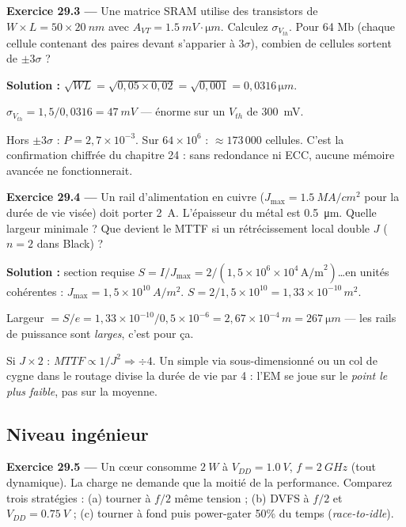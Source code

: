 \documentclass[12pt,a4paper,twoside]{book}
\begin{document}
\textbf{Exercice 29.3 ---} Une matrice SRAM utilise des transistors de $W{\times}L = 50{\times}\SI{20}{nm}$ avec $A_{VT} = \SI{1.5}{mV\cdot\micro m}$. Calculez $\sigma_{V_{th}}$. Pour 64 Mb (chaque cellule contenant des paires devant s'apparier à $3\sigma$), combien de cellules sortent de $\pm 3\sigma$ ?

\begin{pratique}
\textbf{Solution :} $\sqrt{WL} = \sqrt{0{,}05\times0{,}02} = \sqrt{0{,}001} = 0{,}0316\,\si{\micro m}$.

$\sigma_{V_{th}} = 1{,}5/0{,}0316 = \SI{47}{mV}$ --- énorme sur un $V_{th}$ de \SI{300}{mV}.

Hors $\pm3\sigma$ : $P = 2{,}7\times10^{-3}$. Sur $64\times10^6$ : $\approx 173\,000$ cellules. C'est la confirmation chiffrée du chapitre 24 : sans redondance ni ECC, aucune mémoire avancée ne fonctionnerait.
\end{pratique}

\textbf{Exercice 29.4 ---} Un rail d'alimentation en cuivre ($J_{\max} = \SI{1.5}{MA/cm^2}$ pour la durée de vie visée) doit porter \SI{2}{A}. L'épaisseur du métal est \SI{0.5}{\micro m}. Quelle largeur minimale ? Que devient le MTTF si un rétrécissement local double $J$ ($n = 2$ dans Black) ?

\begin{pratique}
\textbf{Solution :} section requise $S = I/J_{\max} = 2/(1{,}5\times10^6\times10^{4}\,\text{A/m}^2)$\ldots en unités cohérentes : $J_{\max} = 1{,}5\times10^{10}\,\si{A/m^2}$. $S = 2/1{,}5\times10^{10} = 1{,}33\times10^{-10}\,\si{m^2}$.

Largeur $= S/e = 1{,}33\times10^{-10}/0{,}5\times10^{-6} = 2{,}67\times10^{-4}\,\si{m} = \SI{267}{\micro m}$ --- les rails de puissance sont \textit{larges}, c'est pour ça.

Si $J \times 2$ : $MTTF \propto 1/J^2 \Rightarrow \div 4$. Un simple via sous-dimensionné ou un col de cygne dans le routage divise la durée de vie par 4 : l'EM se joue sur le \textit{point le plus faible}, pas sur la moyenne.
\end{pratique}

\subsection*{Niveau ingénieur}

\textbf{Exercice 29.5 ---} Un cœur consomme $\SI{2}{W}$ à $V_{DD} = \SI{1.0}{V}$, $f = \SI{2}{GHz}$ (tout dynamique). La charge ne demande que la moitié de la performance. Comparez trois stratégies : (a) tourner à $f/2$ même tension ; (b) DVFS à $f/2$ et $V_{DD} = \SI{0.75}{V}$ ; (c) tourner à fond puis power-gater 50\% du temps (\textit{race-to-idle}).
\end{document}
